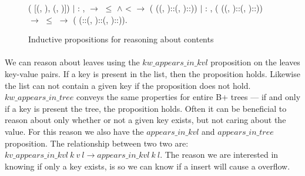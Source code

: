 \begin{figure}
\begin{coqdoccode}
  \coqdocindent{8.00em}
     (   [(, ), (, )])\coqdoceol
  \coqdocindent{1.00em}
  \ensuremath{|} : \coqdockw{\ensuremath{\forall}}     , \coqdoceol
  \coqdocindent{8.00em}
      \ensuremath{\rightarrow}  \ensuremath{\le}  \ensuremath{\land}  <  \ensuremath{\rightarrow}\coqdoceol
  \coqdocindent{8.00em}
     (   ((, )::(, )::))\coqdoceol
  \coqdocindent{1.00em}
  \ensuremath{|} : \coqdockw{\ensuremath{\forall}}      ,\coqdoceol
  \coqdocindent{8.00em}
     (   ((, )::(, )::)) \ensuremath{\rightarrow} \coqdoceol
  \coqdocindent{8.00em}
   \ensuremath{\le}  \ensuremath{\rightarrow}\coqdoceol
  \coqdocindent{8.00em}
     (   (::(, )::(, )::)).\coqdoceol
  \end{coqdoccode}
\caption{Inductive propositions for reasoning about contents}
\label{fig:aik_and_ait}
\end{figure}

\paragraph{}
We can reason about leaves using the $kw\_appears\_in\_kvl$ proposition on the leaves key-value pairs. If a key is present in the list, then the proposition holds. Likewise the list can not contain a given key if the proposition does not hold. $kw\_appears\_in\_tree$ conveys the same properties for entire B+ trees --- if and only if a key is present the tree, the proposition holds. Often it can be beneficial to reason about only whether or not a given key exists, but not caring about the value. For this reason we also have the $appears\_in\_kvl$ and $appears\_in\_tree$ proposition. The relationship between two two are: $kv\_appears\_in\_kvl~k~v~l \rightarrow appears\_in\_kvl~k~l$. The reason we are interested in knowing if only a key exists, is so we can know if a insert will cause a overflow.

